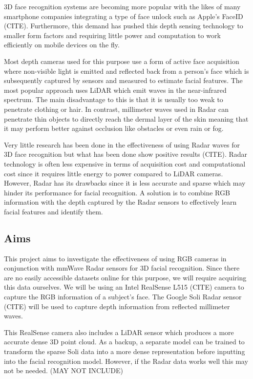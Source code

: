 \documentclass{interim}
\begin{document}
3D face recognition systems are becoming more popular with the likes of many smartphone companies integrating a type of face unlock such as Apple's FaceID \cite{}(CITE). Furthermore, this demand has pushed this depth sensing technology to smaller form factors and requiring little power and computation to work efficiently on mobile devices on the fly.

Most depth cameras used for this purpose use a form of active face acquisition where non-visible light is emitted and reflected back from a person's face which is subsequently captured by sensors and measured to estimate facial features. The most popular approach uses LiDAR which emit waves in the near-infrared spectrum. The main disadvantage to this is that it is usually too weak to penetrate clothing or hair. In contrast, millimeter waves used in Radar can penetrate thin objects to directly reach the dermal layer of the skin meaning that it may perform better against occlusion like obstacles or even rain or fog.

Very little research has been done in the effectiveness of using Radar waves for 3D face recognition but what has been done show positive results \cite{}(CITE). Radar technology is often less expensive in terms of acquisition cost and computational cost since it requires little energy to power compared to LiDAR cameras. However, Radar has its drawbacks since it is less accurate and sparse which may hinder its performance for facial recognition. A solution is to combine RGB information with the depth captured by the Radar sensors to effectively learn facial features and identify them.

\subsection{Aims}
This project aims to investigate the effectiveness of using RGB cameras in conjunction with mmWave Radar sensors for 3D facial recognition. Since there are no easily accessible datasets online for this purpose, we will require acquiring this data ourselves. We will be using an Intel RealSense L515 \cite{}(CITE) camera to capture the RGB information of a subject's face. The Google Soli Radar sensor \cite{}(CITE) will be used to capture depth information from reflected millimeter waves. 

This RealSense camera also includes a LiDAR sensor which produces a more accurate dense 3D point cloud. As a backup, a separate model can be trained to transform the sparse Soli data into a more dense representation before inputting into the facial recognition model. However, if the Radar data works well this may not be needed. (MAY NOT INCLUDE)
\end{document}
